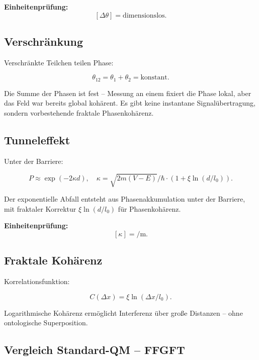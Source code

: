 	\textbf{Einheitenprüfung:}
	\[
	[\Delta \theta] = \text{dimensionslos}.
	\]
	
	\subsection*{Verschränkung}
	
	Verschränkte Teilchen teilen Phase:
	
	\begin{equation}
		\theta_{12} = \theta_1 + \theta_2 = \text{konstant}.
	\end{equation}
	
	Die Summe der Phasen ist fest – Messung an einem fixiert die Phase lokal, aber das Feld war bereits global kohärent. Es gibt keine instantane Signalübertragung, sondern vorbestehende fraktale Phasenkohärenz.
	
	\subsection*{Tunneleffekt}
	
	Unter der Barriere:
	
	\begin{equation}
		P \approx \exp\left( -2 \kappa d \right), \quad \kappa = \sqrt{2m(V-E)} / \hbar \cdot (1 + \xi \ln(d/l_0)).
	\end{equation}
	
	Der exponentielle Abfall entsteht aus Phasenakkumulation unter der Barriere, mit fraktaler Korrektur \(\xi \ln(d/l_0)\) für Phasenkohärenz.
	
	\textbf{Einheitenprüfung:}
	\[
	[\kappa] = \si{\per\meter}.
	\]
	
	\subsection*{Fraktale Kohärenz}
	
	Korrelationsfunktion:
	
	\begin{equation}
		C(\Delta x) = \xi \ln(\Delta x / l_0).
	\end{equation}
	
	Logarithmische Kohärenz ermöglicht Interferenz über große Distanzen – ohne ontologische Superposition.
	
	\subsection*{Vergleich Standard-QM – FFGFT}
	
